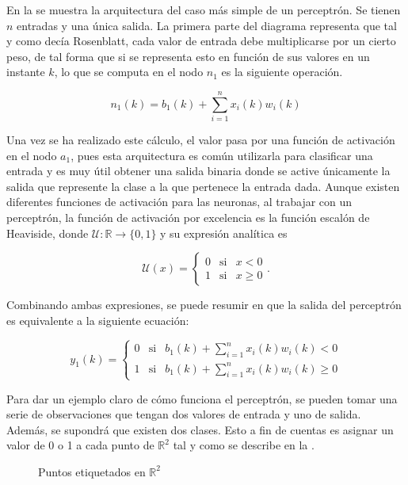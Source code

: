 		En la  se muestra la arquitectura del caso más simple de un perceptrón. Se tienen $n$ entradas y una única salida. La primera parte del diagrama representa que tal y como decía Rosenblatt, cada valor de entrada debe multiplicarse por un cierto peso, de tal forma que si se representa esto en función de sus valores en un instante $k$, lo que se computa en el nodo $n_1$ es la siguiente operación. 
		
		$$
		n_1(k) = b_1(k) + \sum_{i=1}^n x_i(k)w_i(k)
		$$
		
		Una vez se ha realizado este cálculo, el valor pasa por una función de activación en el nodo $a_1$, pues esta arquitectura es común utilizarla para clasificar una entrada y es muy útil obtener una salida binaria donde se active únicamente la salida que represente la clase a la que pertenece la entrada dada. Aunque existen diferentes funciones de activación para las neuronas, al trabajar con un perceptrón, la función de activación por excelencia es la función escalón de Heaviside, donde $\mathcal{U}: \mathbb{R} \longrightarrow \{0, 1\}$ y su expresión analítica es
		
		$$
		\mathcal{U}(x) = \left\{\begin{array}{ccc}
			0 & \text{si} & x < 0\\
			1 & \text{si} & x \geq 0
		\end{array}
		\right..
		$$
		
		Combinando ambas expresiones, se puede resumir en que la salida del perceptrón es equivalente a la siguiente ecuación: 
		
		$$
		y_1(k) = \left\{\begin{array}{ccc}
			0 & \text{si} & b_1(k) + \displaystyle\sum_{i=1}^n x_i(k)w_i(k) < 0\\
			1 & \text{si} & b_1(k) + \displaystyle\sum_{i=1}^n x_i(k)w_i(k) \geq 0
		\end{array}
		\right.
		$$
		
		Para dar un ejemplo claro de cómo funciona el perceptrón, se pueden tomar una serie de observaciones que tengan dos valores de entrada y uno de salida. Además, se supondrá que existen dos clases. Esto a fin de cuentas es asignar un valor de 0 o 1 a cada punto de $\mathbb{R}^2$ tal y como se describe en la . 
		
		\begin{figure}[!h]
			\centering
			\caption{Puntos etiquetados en $\mathbb{R}^2$}
			\label{fig:labeled_data}
		\end{figure}
		
